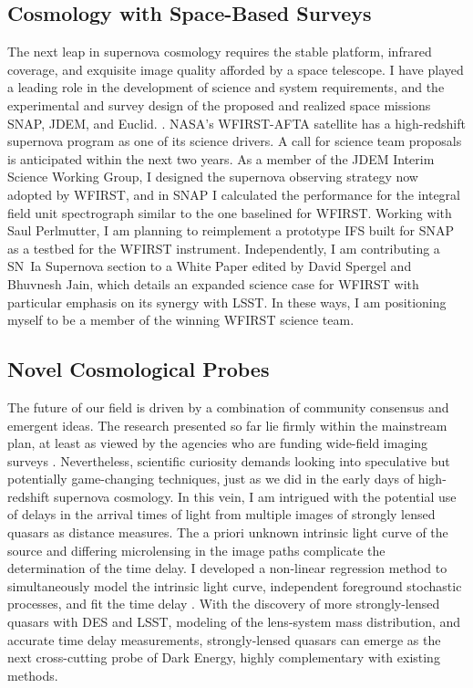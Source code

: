 \documentclass{article}
\begin{document}
\subsection{Cosmology with Space-Based Surveys}
The next leap in supernova cosmology requires the stable platform, infrared coverage, and exquisite image
quality afforded by a space telescope.  I have played a leading role in the development
of science and system requirements, and the experimental and survey design of the proposed
and realized space missions SNAP, JDEM, and Euclid.
\cite{2006PASP..118..205D, 2011PASP..123..470S, 2013Fourspring, 2014arXiv1409.8562A}.
NASA's WFIRST-AFTA satellite has a high-redshift supernova program as one of its science 
drivers.  A call for science team
proposals is anticipated  within the next two years.  As a member of the JDEM Interim Science Working Group, I designed the
supernova observing strategy now adopted by WFIRST, and in SNAP I calculated the performance for the integral
field unit spectrograph similar to the one baselined for WFIRST.  Working with Saul Perlmutter,
I am planning to reimplement a prototype IFS built for SNAP as a testbed for
the WFIRST instrument.  Independently, I am contributing a SN~Ia Supernova section to a White Paper 
edited by David Spergel and Bhuvnesh
Jain, which details an expanded science case for WFIRST with particular emphasis
on its synergy with LSST.  In these ways, I am positioning myself to be a member of the winning WFIRST science
team.


\subsection{Novel Cosmological Probes}
The future of our field is driven by a combination of community consensus and emergent ideas.
The research presented so far  lie firmly within the
mainstream plan, at least as viewed by the agencies who are funding wide-field imaging surveys
\cite{2013arXiv1309.5386D,2013arXiv1309.5382K}.
Nevertheless, scientific curiosity demands looking into speculative but potentially game-changing
techniques, just as we did in the early days of high-redshift supernova cosmology.
In this vein, I am intrigued with the potential use of delays in the arrival times of light from multiple images
of strongly lensed quasars as distance measures.  The a priori unknown intrinsic light curve of the source and differing microlensing
in the image paths complicate the determination of the time delay.  I developed a
non-linear regression method to simultaneously model the intrinsic light curve, independent foreground
stochastic processes, and fit the time delay \cite{2013PhRvD..87l3512H}.  With the discovery of more 
strongly-lensed quasars with DES and LSST, modeling of the lens-system mass distribution, and accurate
time delay measurements, strongly-lensed
quasars can emerge as the next cross-cutting probe of Dark Energy, highly complementary with existing methods.
\end{document}
